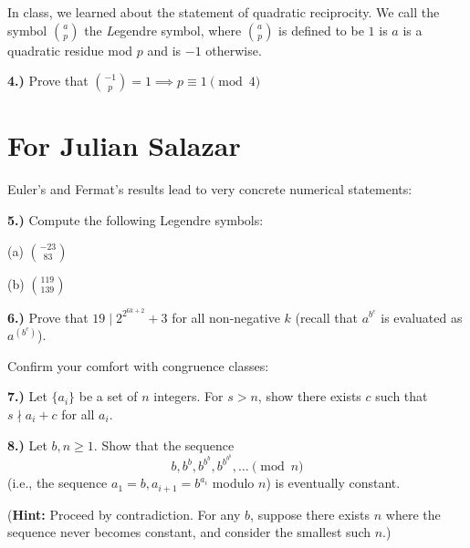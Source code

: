 \documentclass[10pt]{amsart}
\begin{document}
\medskip

\noindent In class, we learned about the statement of quadratic reciprocity. We call the symbol $a \choose p$ the {\emph Legendre symbol}, where $a \choose p$ is defined to be $1$ is $a$ is a quadratic residue mod $p$ and is $-1$ otherwise.

\medskip

{\bf 4.)} Prove that ${-1 \choose p} = 1 \implies p \equiv 1 \pmod 4$


\section*{For Julian Salazar}

\noindent Euler's and Fermat's results lead to very concrete numerical statements:

\medskip


{\bf 5.)} Compute the following Legendre symbols:

\smallskip

(a) ${-23 \choose 83}$

\smallskip

(b) ${119 \choose 139}$

{\bf 6.)} Prove that $19 \mid 2^{2^{6k+2}} + 3$ for all non-negative $k$ (recall that $a^{b^c}$ is evaluated as $a^{(b^c)}$).

\medskip
 
\noindent Confirm your comfort with congruence classes:

\medskip

{\bf 7.)} Let $\{a_i\}$ be a set of $n$ integers. For $s > n$, show there exists $c$ such that $s \nmid a_i + c$ for all $a_i$.

\medskip

{\bf 8.)} Let $b, n \ge 1$. Show that the sequence
\[
b, b^b, b^{b^b}, b^{b^{b^b}}, \dotsc \pmod{n}
\]
(i.e., the sequence $a_1 = b, a_{i+1} = b^{a_{i}}$ modulo $n$) is eventually constant.

\smallskip

({\bf Hint:} Proceed by contradiction. For any $b$, suppose there exists $n$ where the sequence never becomes constant, and consider the smallest such $n$.)
\end{document}
